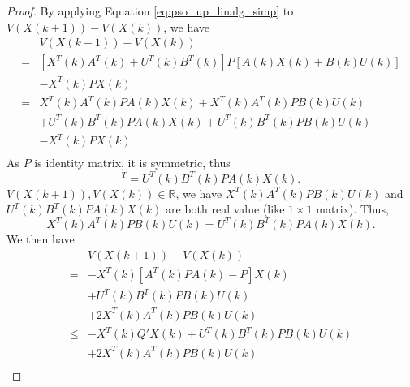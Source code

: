 \documentclass{sig-alternate}
\begin{document}
\begin{proof}
By applying Equation \eqref{eq:pso_up_linalg_simp} to $ V( X(k+1) ) - V( X(k) ) $, we have
\begin{equation}
\label{eq:lyapunov_delta2}
\begin{aligned}
& V( X(k+1) ) - V( X(k) ) \\
= & [ X^{T}(k)  A^{T}(k) + U^{T}(k) B^{T}(k) ] P [ A(k) X(k) + B(k) U(k) ] \\ & - X^{T}(k) P X(k) \\
= & X^{T}(k)  A^{T}(k) P A(k) X(k) +  X^{T}(k)  A^{T}(k) P B(k) U(k) \\
& + U^{T}(k) B^{T}(k) P A(k) X(k) + U^{T}(k) B^{T}(k) P B(k) U(k) \\ & - X^{T}(k) P X(k) \\
\end{aligned}
\end{equation}
As $ P $ is identity matrix, it is symmetric, thus
\begin{equation}
[ X^{T}(k)  A^{T}(k) P B(k) U(k) ]^{T} =  U^{T}(k) B^{T}(k) P A(k) X(k).
\end{equation}
$ V( X(k+1) ) , V( X(k) ) \in \mathbb{R} $, 
we have $ X^{T}(k)  A^{T}(k) P B(k) U(k) $ and $  U^{T}(k) B^{T}(k) P A(k) X(k) $ are both real value (like $ 1 \times 1 $ matrix).
Thus, 
\begin{equation}
 X^{T}(k)  A^{T}(k) P B(k) U(k) =   U^{T}(k) B^{T}(k) P A(k) X(k) .
\end{equation}
We then have
\begin{equation}
\label{eq:lyapunov_delta3}
\begin{aligned}
& V( X(k+1) ) - V( X(k) ) \\
= & - X^{T}(k) [ A^{T}(k) P A(k) - P ] X(k) \\
& + U^{T}(k) B^{T}(k) P B(k) U(k)  \\
& + 2 X^{T}(k)  A^{T}(k) P B(k) U(k) \\
\leq & - X^{T}(k) Q' X(k)  + U^{T}(k) B^{T}(k) P B(k) U(k) \\
& + 2 X^{T}(k)  A^{T}(k) P B(k) U(k) \\
\end{aligned}
\end{equation}


\end{proof}
\end{document}
